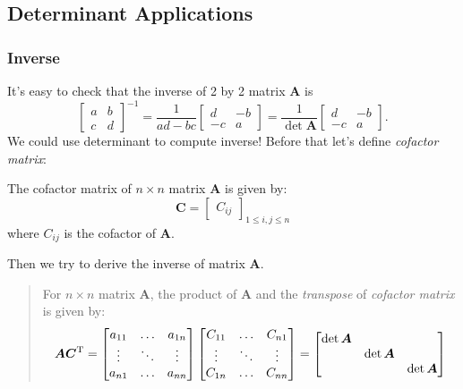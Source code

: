 \subsection{Determinant Applications}
\subsubsection{Inverse}
It's easy to check that the inverse of 2 by 2 matrix $\bm A$ is 
\[
\begin{bmatrix}
a&b\\c&d
\end{bmatrix}^{-1}=\frac{1}{ad-bc}\begin{bmatrix}
d&-b\\-c&a
\end{bmatrix}=\frac{1}{\det\bm A}\begin{bmatrix}
d&-b\\-c&a
\end{bmatrix}.
\]
We could use determinant to compute inverse! Before that let's define \emph{cofactor matrix}:
\begin{definition}
The cofactor matrix of $n\times n$ matrix $\bm A$ is given by:
\[
\bm C=\begin{bmatrix}
C_{ij}
\end{bmatrix}_{1\le i,j\le n}
\]
where $C_{ij}$ is the cofactor of $\bm A$.
\end{definition}
Then we try to derive the inverse of matrix $\bm A$. 
\begin{quotation}
For $n\times n$ matrix $\bm A$, the product of $\bm A$ and the \emph{transpose} of \textit{cofactor matrix} is given by:
\begin{equation}\label{11.1}
\bm A\bm C\trans=\begin{bmatrix}
a_{11}&\dots&a_{1n}\\\vdots&\ddots&\vdots\\a_{n1}&\dots&a_{nn}
\end{bmatrix}\begin{bmatrix}
C_{11}&\dots&C_{n1}\\\vdots&\ddots&\vdots\\C_{1n}&\dots&C_{nn}
\end{bmatrix}=\begin{bmatrix}
\det\bm A&&\\&\det\bm A&\\&&\det\bm A
\end{bmatrix}
\end{equation}
\end{quotation}
